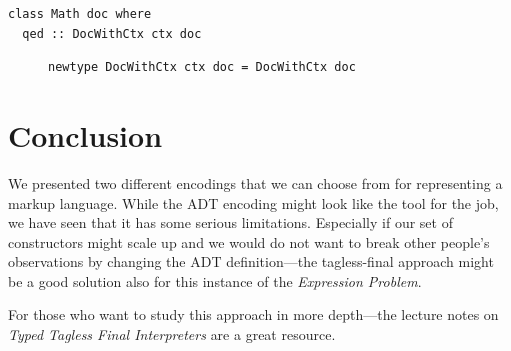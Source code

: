 \begin{lstlisting}
class Math doc where
  qed :: DocWithCtx ctx doc
\end{lstlisting}

\begin{figure}[t]
\begin{lstlisting}
newtype DocWithCtx ctx doc = DocWithCtx doc
\end{lstlisting}
\end{figure}

\section{Conclusion}

We presented two different encodings that we can choose from for representing a
markup language. While the ADT encoding might look like the tool for the job, we
have seen that it has some serious limitations. Especially if our set of
constructors might scale up and we would do not want to break other people's
observations by changing the ADT definition—the tagless-final approach might be a
good solution also for this instance of the \emph{Expression Problem}.

For those who want to study this approach in more depth—the lecture notes on
\emph{Typed Tagless Final Interpreters} \cite{finally-tagless-tut} are a great
resource.
